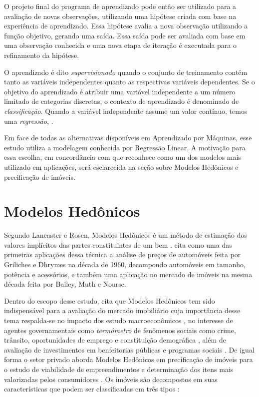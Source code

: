 O projeto final do programa de aprendizado pode então ser utilizado para a avaliação de novas observações, utilizando uma hipótese criada com  base na experiência de aprendizado. Essa hipótese avalia a nova observação utilizando a função objetivo, gerando uma saída. Essa saída pode ser avaliada com base em uma observação conhecida e uma nova etapa de iteração é executada para o refinamento da hipótese. 

O aprendizado é dito \textit{supervisionado} quando o conjunto de treinamento contém tanto as variáveis independentes quanto as respectivas variáveis dependentes. Se o objetivo do aprendizado é atribuir uma variável independente a um número limitado de categorias discretas, o contexto de aprendizado é denominado de \textit{classificação}. Quando a variável independente assume um valor contínuo, temos uma \textit{regressão}, \cite[p.3,p.xi]{Bishop, Hastie}.


Em face de todas as alternativas disponíveis em Aprendizado por Máquinas, esse estudo utiliza a modelagem conhecida por Regressão Linear. A motivação para essa escolha, em concordância com \cite[p.50]{Murphy} que reconhece como um dos modelos mais utilizado em aplicações, será esclarecida na seção sobre Modelos Hedônicos e precificação de imóveis. 




\section{Modelos Hedônicos}\label{sec:model_hedonico}

Segundo Lancaster e Rosen, Modelos Hedônicos é um método de estimação dos valores implícitos das partes constituintes de um bem \cite{Long}. \cite{Macedo} cita como uma das primeiras aplicações dessa técnica a análise de preços de automóveis feita por Griliches e Dhrymes na década de 1960, decompondo automóveis em tamanho, potência e acessórios, e também uma aplicação no mercado de imóveis na mesma década feita por Bailey, Muth e Nourse. 

Dentro do escopo desse estudo, \cite{Long} cita que Modelos Hedônicos tem sido indispensável para a avaliação do mercado imobiliário cuja importância desse tema respalda-se no impacto dos estudo macroeconômicos , no interesse de agentes governamentais como \textit{termômetro} de fenômenos sociais como crime, trânsito, oportunidades de emprego e constituição demográfica \cite{IsmailMacGregor}, além de avaliação de investimentos em benfeitorias públicas e programas sociais \cite{Long}. De igual forma o setor privado aborda Modelos Hedônicos em precificação de imóveis para o estudo de viabilidade de empreendimentos e determinação dos itens mais valorizadas pelos consumidores \cite{Neto}. Os imóveis são decompostos em suas características que podem ser classificadas em três tipos \cite[p.3]{Long}: 

